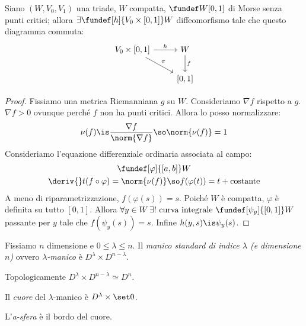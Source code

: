 

\begin{lemma}
	Siano $(W,V_0,V_1)$ una triade, $W$ compatta, $\fundef W{[0,1]}$ di Morse senza punti critici; allora $\exists\fundef[h]{V_0\times[0,1]}W$ diffeomorfismo tale che questo diagramma commuta:
	\begin{equation*}
		\begin{tikzcd}
			V_0\times[0,1] \arrow[r, "h"] \arrow[rd, "\pi"] & W \arrow[d, "f"] \\
			& {[0,1]}
		\end{tikzcd}
	\end{equation*}
\end{lemma}

\begin{proof}
	Fissiamo una metrica Riemanniana $g$ su $W$.
	Consideriamo $\nabla f$ rispetto a $g$.
	$\nabla f>0$ ovunque perché $f$ non ha punti critici.
	Allora lo posso normalizzare:
	\[\nu(f)\is\frac{\nabla f}{\norm{\nabla f}}\so
	\norm{\nu(f)}=1\]
	Consideriamo l'equazione differenziale ordinaria associata al campo:
	\begin{gather*}
		\fundef[\varphi]{[a,b]}W \\
		\deriv{}t(f\circ\varphi)=\norm{\nu(f)} \so f(\varphi(t))=t+\mathrm{costante}
	\end{gather*}
	A meno di riparametrizzazione, $f(\varphi(s))=s$.
	Poiché $W$ è compatta, $\varphi$ è definita su tutto $[0,1]$.
	Allora $\forall y\in W\,\exists!\text{ curva integrale }\fundef[\psi_y]{[0,1]}W$ passante per $y$ tale che $f(\psi_y(s))=s$.
	Infine $h(y,s)\is\psi_y(s)$.
\end{proof}

\begin{defn}[Manico]
	Fissiamo $n$ dimensione e $0\le\lambda\le n$.
	Il \emph{manico standard di indice $\lambda$ (e dimensione $n$)} ovvero \emph{$\lambda$-manico} è $D^\lambda\times D^{n-\lambda}$.
\end{defn}

\begin{oss}
	Topologicamente $D^\lambda\times D^{n-\lambda}\simeq D^n$.
\end{oss}

\begin{defn}[Cuore]
	Il \emph{cuore} del $\lambda$-manico è $D^\lambda\times\set0$.
\end{defn}

\begin{defn}[A-sfera]
	L'\emph{a-sfera} è il bordo del cuore.
\end{defn}

